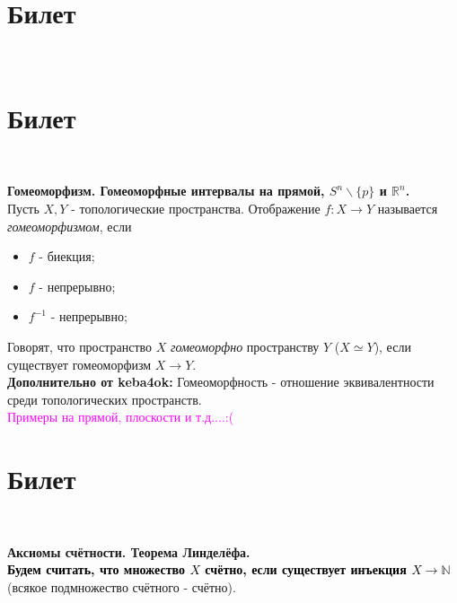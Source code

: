 \documentclass[a4paper,100pt]{article}
\theoremstyle{indented}
\begin{document}
\section{Билет} \

\medskip

\section{Билет} \

\medskip

\textbf{Гомеоморфизм. Гомеоморфные интервалы на прямой, $S^n \backslash \{p\}$ и $\mathbb{R}^n$.}\\

Пусть $X, Y$ - топологические пространства. Отображение $f: X \rightarrow Y $ называется \textit{гомеоморфизмом}, если 
\begin{itemize}
    \item $f$ - биекция;
    \item $f$ - непрерывно;
    \item $f^{-1}$ - непрерывно;
\end{itemize}

Говорят, что пространство $X$ \textit{гомеоморфно} пространству $Y$ ($X \simeq Y$), если существует гомеоморфизм $X \rightarrow Y$. \\

\textbf{Дополнительно от keba4ok:} Гомеоморфность - отношение эквивалентности среди топологических пространств. \\

\textcolor{magenta}{Примеры на прямой, плоскости и т.д....:(}



\section{Билет} \

\medskip

\textbf{Аксиомы счётности. Теорема Линделёфа.}\\
    
    \textbf{\textcolor{black}{Будем считать, что множество $X$ счётно, если существует инъекция $X \rightarrow \mathbb N$}} (всякое подмножество счётного - счётно).
    
\end{document}
